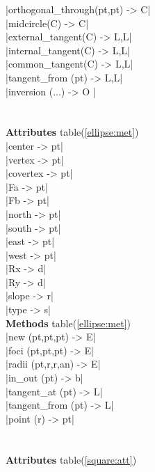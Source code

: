 \documentclass[DIV         = 14,
               fontsize    = 10,
               index       = totoc,
               twoside,
               cadre,
               headings    = small
               ]{tkz-doc}
\begin{document}
\begin{multicols}{3}
|orthogonal_through(pt,pt) -> C|   \\
|midcircle(C)              -> C|   \\
|external_tangent(C)       -> L,L| \\
|internal_tangent(C)       -> L,L| \\
|common_tangent(C)         -> L,L| \\
|tangent_from (pt)         -> L,L| \\
|inversion (...)           -> O |  \\
                                   \\
            \\
\textbf{Attributes} table(\ref{ellipse:met})      \\
|center                    -> pt|  \\
|vertex                    -> pt|  \\
|covertex                  -> pt|  \\
|Fa                        -> pt|  \\
|Fb                        -> pt|  \\
|north                     -> pt|  \\
|south                     -> pt|  \\
|east                      -> pt|  \\
|west                      -> pt|  \\
|Rx                        -> d|   \\
|Ry                        -> d|   \\
|slope                     -> r|   \\
|type                      -> s|   \\
\textbf{Methods} table(\ref{ellipse:met}) \\
|new (pt,pt,pt)            -> E|   \\
|foci (pt,pt,pt)           -> E|   \\
|radii (pt,r,r,an)         -> E|   \\
|in_out (pt)               -> b|   \\
|tangent_at (pt)           -> L|   \\
|tangent_from (pt)         -> L|   \\
|point (r)                 -> pt|  \\
   \\
             \\                      
 \textbf{Attributes} table(\ref{square:att})      \\

\end{multicols}
\end{document}
